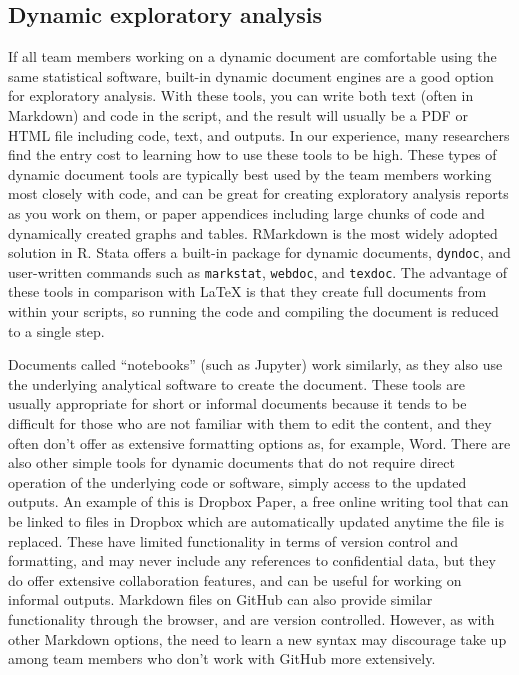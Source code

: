 \subsection{Dynamic exploratory analysis}	

If all team members working on a dynamic document are comfortable using the same statistical software,
built-in dynamic document engines are a good option for exploratory analysis.
With these tools, 
you can write both text (often in Markdown) and code in the script,
and the result will usually be a PDF or HTML file including code, text, and outputs.
In our experience, many researchers find the entry cost to learning how to use these tools to be high.
These types of dynamic document tools are typically best used by the team members working most closely with code,
and can be great for creating exploratory analysis reports as you work on them, 
or paper appendices including large chunks of code and dynamically created graphs and tables.
RMarkdown is the most widely adopted solution in R.
Stata offers a built-in package for dynamic documents, \texttt{dyndoc}, 
and user-written commands such as \texttt{markstat},
\texttt{webdoc}, and
\texttt{texdoc}.
The advantage of these tools in comparison with LaTeX is that 
they create full documents from within your scripts, 
so running the code and compiling the document is reduced to a single step.

Documents called ``notebooks'' (such as Jupyter) work similarly,
as they also use the underlying analytical software to create the document.
These tools are usually appropriate for short or informal documents
because it tends to be difficult for those who are not familiar with them to edit the content,
and they often don't offer as extensive formatting options as, for example, Word.
There are also other simple tools for dynamic documents
that do not require direct operation of the underlying code or software,
simply access to the updated outputs.
An example of this is Dropbox Paper,
a free online writing tool that can be linked to files in Dropbox
which are automatically updated anytime the file is replaced.
These have limited functionality in terms of version control and formatting,
and may never include any references to confidential data,
but they do offer extensive collaboration features, 
and can be useful for working on informal outputs. 
Markdown files on GitHub can also provide similar functionality through the browser,
and are version controlled.
However, as with other Markdown options, the need to learn a new syntax may
discourage take up among team members who don't work with GitHub more extensively.

